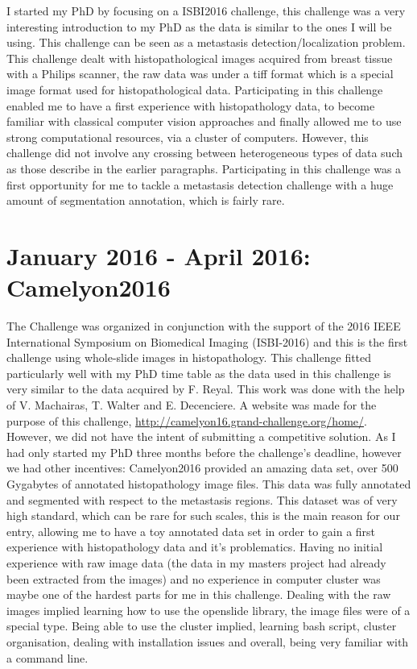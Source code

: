 \documentclass[a4paper,10pt]{article}
\begin{document}
I started my PhD by focusing on a ISBI2016 challenge, this challenge was a very interesting introduction to my PhD as the data is similar to the ones I will be using. This challenge can be seen as a metastasis detection/localization problem. This challenge dealt with histopathological images acquired from breast tissue with a Philips scanner, the raw data was under a tiff format which is a special image format used for histopathological data. Participating in this challenge enabled me to have a first experience with histopathology data, to become familiar with classical computer vision approaches and finally allowed me to use strong computational resources, via a cluster of computers. However, this challenge did not involve any crossing between heterogeneous types of data such as those describe in the earlier paragraphs. Participating in this challenge was a first opportunity for me to tackle a metastasis detection challenge with a huge amount of segmentation annotation, which is fairly rare.

\section{January 2016 - April 2016: Camelyon2016}

The Challenge was organized in conjunction with the support of the 2016 IEEE International Symposium on Biomedical Imaging  (ISBI-2016) and this is the first challenge using whole-slide images in histopathology. This challenge fitted particularly well with my PhD time table as the data used in this challenge is very similar to the data acquired by F. Reyal. 
This work was done with the help of V. Machairas, T. Walter and E. Decenciere. A website was made for the purpose of this challenge, \url{http://camelyon16.grand-challenge.org/home/}.
\\
However, we did not have the intent of submitting a competitive solution. As I had only started my PhD three months before the challenge's deadline, however we had other incentives: Camelyon2016 provided an amazing data set, over 500 Gygabytes of annotated histopathology image files. This data was fully annotated and segmented with respect to the metastasis regions. This dataset was of very high standard, which can be rare for such scales, this is the main reason for our entry, allowing me to have a toy annotated data set in order to gain a first experience with histopathology data and it's problematics. Having no initial experience with raw image data (the data in my masters project had already been extracted from the images) and no experience in computer cluster was maybe one of the hardest parts for me in this challenge. Dealing with the raw images implied learning how to use the openslide library, the image files were of a special type. Being able to use the cluster implied, learning bash script, cluster organisation, dealing with installation issues and overall, being very familiar with a command line.
\end{document}
